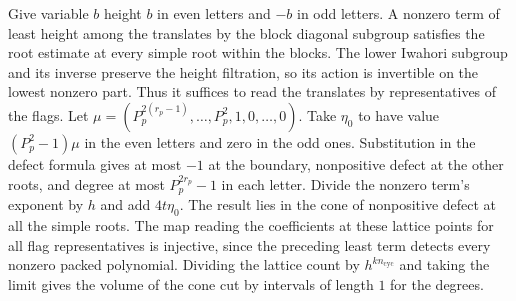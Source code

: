 Give variable \(b\) height \(b\) in even letters and \(-b\) in
odd letters. A nonzero term of least height among the translates
by the block diagonal subgroup satisfies the root estimate at
every simple root within the blocks. The lower Iwahori subgroup
and its inverse preserve the height filtration, so its action
is invertible on the lowest nonzero part. Thus it suffices to
read the translates by representatives of the flags.
Let \(\mu=(P_p^{2(r_p-1)},\ldots,P_p^2,1,0,\ldots,0)\).
Take \(\eta_0\) to have value \((P_p^2-1)\mu\) in the even
letters and zero in the odd ones. Substitution in the defect
formula gives at most \(-1\) at the boundary, nonpositive
defect at the other roots, and degree at most \(P_p^{2r_p}-1\)
in each letter. Divide the nonzero term's exponent by \(h\)
and add \(4t\eta_0\). The result lies in the cone of nonpositive
defect at all the simple roots. The map reading the coefficients
at these lattice points for all flag representatives is
injective, since the preceding least term detects every
nonzero packed polynomial. Dividing the lattice count by
\(h^{kn_\mathrm{cyc}}\) and taking the limit gives the volume of
the cone cut by intervals of length \(1\) for the degrees.

